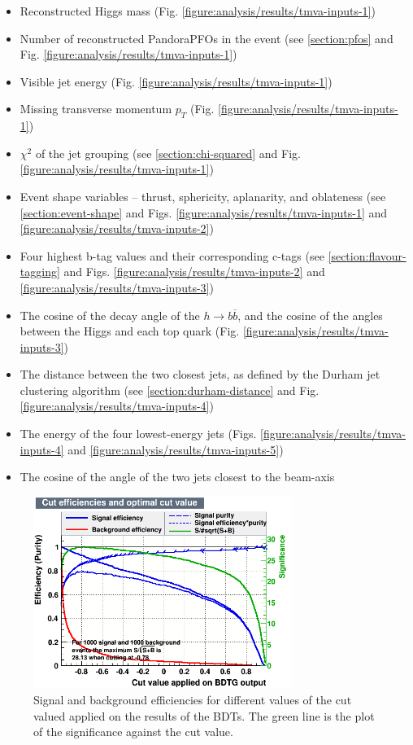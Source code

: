 \begin{itemize}
	\item Reconstructed Higgs mass (Fig. \ref{figure:analysis/results/tmva-inputs-1})
	\item Number of reconstructed PandoraPFOs in the event (see \ref{section:pfos} and Fig. \ref{figure:analysis/results/tmva-inputs-1})
	\item Visible jet energy (Fig. \ref{figure:analysis/results/tmva-inputs-1})
	\item Missing transverse momentum $p_T$  (Fig. \ref{figure:analysis/results/tmva-inputs-1})
	\item $\chi^2$ of the jet grouping (see \ref{section:chi-squared} and Fig. \ref{figure:analysis/results/tmva-inputs-1})
	\item Event shape variables -- thrust, sphericity, aplanarity, and oblateness (see \ref{section:event-shape} and Figs. \ref{figure:analysis/results/tmva-inputs-1} and \ref{figure:analysis/results/tmva-inputs-2})
	\item Four highest b-tag values and their corresponding c-tags (see \ref{section:flavour-tagging} and Figs. \ref{figure:analysis/results/tmva-inputs-2} and \ref{figure:analysis/results/tmva-inputs-3})
	\item The cosine of the decay angle of the $h \rightarrow b\overline{b}$, and the cosine of the angles between the Higgs and each top quark (Fig. \ref{figure:analysis/results/tmva-inputs-3})
	\item The distance between the two closest jets, as defined by the Durham jet clustering algorithm (see \ref{section:durham-distance} and Fig. \ref{figure:analysis/results/tmva-inputs-4})
	\item The energy of the four lowest-energy jets (Figs. \ref{figure:analysis/results/tmva-inputs-4} and \ref{figure:analysis/results/tmva-inputs-5})
	\item The cosine of the angle of the two jets closest to the beam-axis 
\end{itemize}

\begin{figure}[h]
	\centering
	\includegraphics[width=0.75\textwidth]{../Pictures/Analysis/BDTs/mvaeffs_BDTG.png}
	\caption{Signal and background efficiencies for different values of the cut valued applied on the results of the BDTs. The green line is the plot of the significance against the cut value.}
	\label{figure:analysis/results/tmva-efficiency}
\end{figure}

